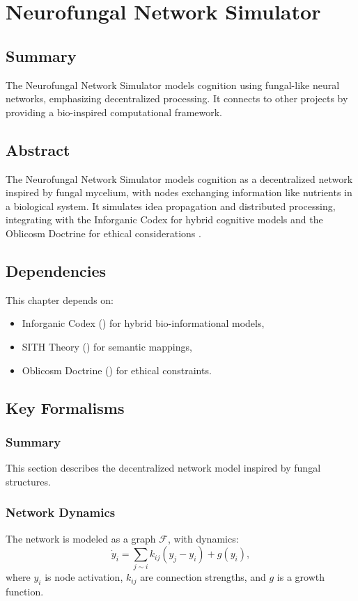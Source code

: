 \documentclass[11pt,oneside]{memoir}
\theoremstyle{plain}
\begin{document}
\chapter{Neurofungal Network Simulator}
\label{sec:neurofungal}

\section{Summary}
The Neurofungal Network Simulator models cognition using fungal-like neural networks, emphasizing decentralized processing. It connects to other projects by providing a bio-inspired computational framework.

\section{Abstract}
The Neurofungal Network Simulator models cognition as a decentralized network inspired by fungal mycelium, with nodes exchanging information like nutrients in a biological system. It simulates idea propagation and distributed processing, integrating with the Inforganic Codex for hybrid cognitive models and the Oblicosm Doctrine for ethical considerations \cite{lindenmayer}.

\section{Dependencies}
This chapter depends on:
\begin{itemize}
    \item Inforganic Codex () for hybrid bio-informational models,
    \item SITH Theory () for semantic mappings,
    \item Oblicosm Doctrine () for ethical constraints.
\end{itemize}

\section{Key Formalisms}
\subsection{Summary}
This section describes the decentralized network model inspired by fungal structures.

\subsection{Network Dynamics}
The network is modeled as a graph \(\mathcal{F}\), with dynamics:
\begin{equation}
    \dot{y}_i = \sum_{j \sim i} k_{ij} (y_j - y_i) + g(y_i),
\end{equation}
where \(y_i\) is node activation, \(k_{ij}\) are connection strengths, and \(g\) is a growth function.
\end{document}
